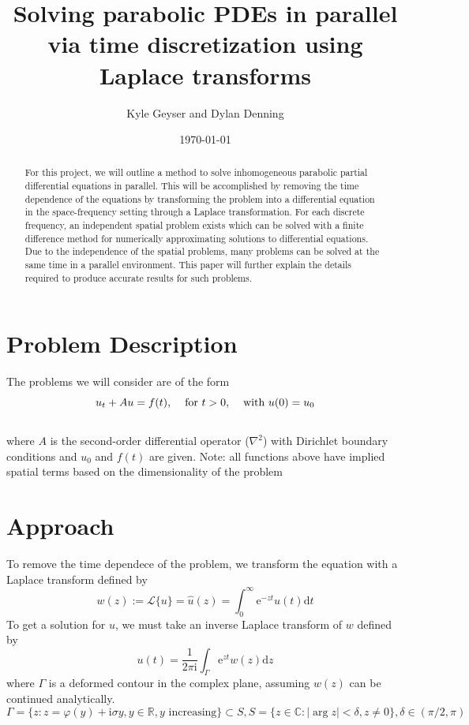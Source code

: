 \documentclass[letterpaper, 12pt]{article}
\title{Solving parabolic PDEs in parallel via time discretization using Laplace transforms}
\author{Kyle Geyser and Dylan Denning}
\date{\today}
\def\e{\text{e}}
\def\L{\mathcal{L}}
\def\i{\text{i}}
\def\d{\text{d}}
\def\R{{\mathbb{R}}}
\def\C{{\mathbb{C}}}
\begin{document}
	\begin{titlepage}
		\maketitle
		
		\vspace{3cm}
 
		\begin{abstract}
			For this project, we will outline a method to solve inhomogeneous parabolic partial differential equations in parallel. This will be accomplished by removing the time dependence of the equations by transforming the problem into a differential equation in the space-frequency setting through a Laplace transformation. For each discrete frequency, an independent spatial problem exists which can be solved with a finite difference method for numerically approximating solutions to differential equations. Due to the independence of the spatial problems, many problems can be solved at the same time in a parallel environment. This paper will further explain the details required to produce accurate results for such problems.
		\end{abstract}
	\end{titlepage}
	
	\section*{Problem Description}
		The problems we will consider are of the form
		$$u_t+Au=f(t),\hspace{4mm}\text{for }t>0,\hspace{4mm}\text{with }u(0)=u_0$$ \\
		where $A$ is the second-order differential operator ($\nabla^2$) with Dirichlet boundary conditions and $u_0$ and $f(t)$ are given.
		Note: all functions above have implied spatial terms based on the dimensionality of the problem

	\section*{Approach}
		To remove the time dependece of the problem, we transform the equation with a Laplace transform defined by
		$$w(z):=\L\{u\}=\hat{u}(z)=\int_0^\infty\e^{-zt}u(t)\d t$$
		To get a solution for $u$, we must take an inverse Laplace transform of $w$ defined by
		$$u(t)=\frac{1}{2\pi\i}\int_\Gamma\e^{zt}w(z)\d z$$	
		where $\Gamma$ is a deformed contour in the complex plane, assuming $w(z)$ can be continued analytically. 
		$$\Gamma=\{z:z=\varphi(y)+\i\sigma y, y\in\R, y\text{ increasing}\}\subset S, S=\{z\in\C:|\arg z|<\delta, z\neq 0\}, \delta\in(\pi/2,\pi)$$
		
\end{document}
